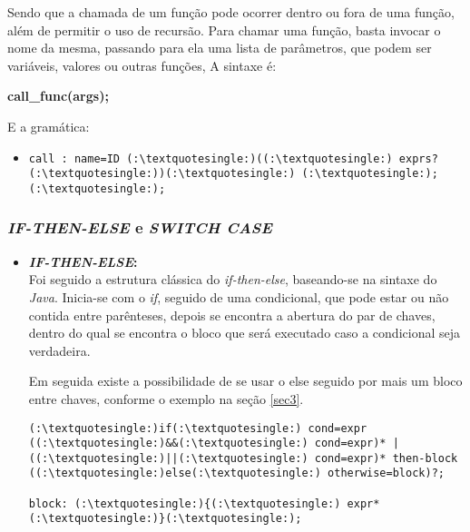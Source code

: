 \begin{itemize}
            Sendo que a chamada de um função pode ocorrer dentro ou fora de uma função, além de permitir o uso de recursão. Para chamar uma função, basta invocar o nome da mesma, passando para ela uma lista de parâmetros, que podem ser variáveis, valores ou outras funções, A sintaxe é:

            \textbf{call\_func(args);}

            E a gramática:
			\begin{itemize}
				\item[ ]
				
    			   \begin{lstlisting}
call : name=ID (:\textquotesingle:)((:\textquotesingle:) exprs? (:\textquotesingle:))(:\textquotesingle:) (:\textquotesingle:);(:\textquotesingle:);            
	           \end{lstlisting}

			\end{itemize}
			
		\subsubsection{\normalsize \textit{IF-THEN-ELSE} e \textit{SWITCH CASE}}
        
        		\begin{itemize}
        			\item \textbf{\textit{IF-THEN-ELSE}:}\\
        				Foi seguido a estrutura clássica do \textit{if-then-else}, baseando-se na sintaxe do \textit{Java}. Inicia-se com o \textit{if}, seguido de uma condicional, que pode estar ou não contida entre parênteses, depois se encontra a abertura do par de chaves, dentro do qual se encontra o bloco que será executado caso a condicional seja verdadeira.
        				
        				Em seguida existe a possibilidade de se usar o else seguido por mais um bloco entre chaves, conforme o exemplo na seção \ref{sec3}.
        			
					\begin{lstlisting}
(:\textquotesingle:)if(:\textquotesingle:) cond=expr ((:\textquotesingle:)&&(:\textquotesingle:) cond=expr)* | ((:\textquotesingle:)||(:\textquotesingle:) cond=expr)* then-block ((:\textquotesingle:)else(:\textquotesingle:) otherwise=block)?;

block: (:\textquotesingle:){(:\textquotesingle:) expr* (:\textquotesingle:)}(:\textquotesingle:);
        				\end{lstlisting}
        			

\end{itemize}
\end{itemize}
